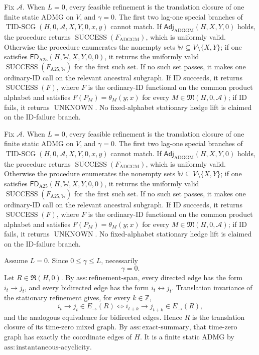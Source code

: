 Fix \(\mathcal A\).  When \(L=0\), every feasible refinement is the translation closure of one finite static ADMG on \(V\), and \(\gamma=0\).  The first two lag-one special branches of \(\operatorname{TID\text{-}SCG}(H,0,\mathcal A,X,Y,0,x,y)\) cannot match.  If \(\mathsf{Adj}_{\mathrm{ADGGM}}(H,X,Y,0)\) holds, the procedure returns \(\operatorname{SUCCESS}(F_{\mathrm{ADGGM}})\), which is uniformly valid.  Otherwise the procedure enumerates the nonempty sets \(\mathbb W\subseteq V\setminus\{X,Y\}\); if one satisfies \(\mathsf{FD}_{\mathrm{A25}}(H,\mathbb W,X,Y,0,0)\), it returns the uniformly valid \(\operatorname{SUCCESS}(F_{\mathrm{A25},\mathbb W})\) for the first such set.  If no such set passes, it makes one ordinary-ID call on the relevant ancestral subgraph.  If ID succeeds, it returns \(\operatorname{SUCCESS}(F)\), where \(F\) is the ordinary-ID functional on the common product alphabet and satisfies \(F(P_M)=\theta_M(y;x)\) for every \(M\in\mathfrak M(H,0,\mathcal A)\); if ID fails, it returns \(\operatorname{UNKNOWN}\).  No fixed-alphabet stationary hedge lift is claimed on the ID-failure branch.

Fix \(\mathcal A\).  When \(L=0\), every feasible refinement is the translation closure of one finite static ADMG on \(V\), and \(\gamma=0\).  The first two lag-one special branches of \(\operatorname{TID\text{-}SCG}(H,0,\mathcal A,X,Y,0,x,y)\) cannot match.  If \(\mathsf{Adj}_{\mathrm{ADGGM}}(H,X,Y,0)\) holds, the procedure returns \(\operatorname{SUCCESS}(F_{\mathrm{ADGGM}})\), which is uniformly valid.  Otherwise the procedure enumerates the nonempty sets \(\mathbb W\subseteq V\setminus\{X,Y\}\); if one satisfies \(\mathsf{FD}_{\mathrm{A25}}(H,\mathbb W,X,Y,0,0)\), it returns the uniformly valid \(\operatorname{SUCCESS}(F_{\mathrm{A25},\mathbb W})\) for the first such set.  If no such set passes, it makes one ordinary-ID call on the relevant ancestral subgraph.  If ID succeeds, it returns \(\operatorname{SUCCESS}(F)\), where \(F\) is the ordinary-ID functional on the common product alphabet and satisfies \(F(P_M)=\theta_M(y;x)\) for every \(M\in\mathfrak M(H,0,\mathcal A)\); if ID fails, it returns \(\operatorname{UNKNOWN}\).  No fixed-alphabet stationary hedge lift is claimed on the ID-failure branch.

Assume \(L=0\).  Since \(0\leq\gamma\leq L\), necessarily
\[
 \gamma=0.
\]
Let \(R\in\mathfrak R(H,0)\).  By \(\mathrm{ass:refinement\text{-}span}\), every directed edge has the form \(i_t\to j_t\), and every bidirected edge has the form \(i_t\leftrightarrow j_t\).  Translation invariance of the stationary refinement gives, for every \(k\in\mathbb Z\),
\[
 i_t\to j_t\in E_{\to}(R)
 \iff i_{t+k}\to j_{t+k}\in E_{\to}(R),
\]
and the analogous equivalence for bidirected edges.  Hence \(R\) is the translation closure of its time-zero mixed graph.  By \(\mathrm{ass:exact\text{-}summary}\), that time-zero graph has exactly the coordinate edges of \(H\).  It is a finite static ADMG by \(\mathrm{ass:instantaneous\text{-}acyclicity}\).

